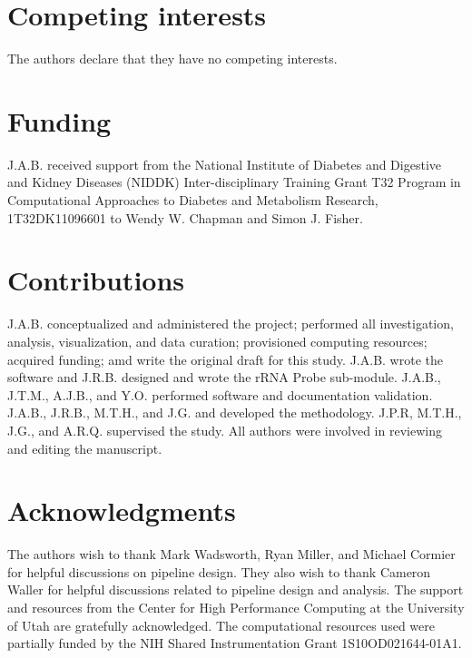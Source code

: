 \documentclass[11pt, a4paper, oneside]{article}
\begin{document}
\section*{Competing interests}
The authors declare that they have no competing interests.

\section*{Funding}
J.A.B. received support from the National Institute of Diabetes and Digestive and Kidney Diseases (NIDDK) Inter-disciplinary Training Grant T32 Program in Computational Approaches to Diabetes and Metabolism Research, 1T32DK11096601 to Wendy W. Chapman and Simon J. Fisher.

\section*{Contributions}
J.A.B. conceptualized and administered the project; performed all investigation, analysis, visualization, and data curation; provisioned computing resources; acquired funding; amd write the original draft for this study. J.A.B. wrote the software and J.R.B. designed and wrote the rRNA Probe sub-module. J.A.B., J.T.M., A.J.B., and Y.O. performed software and documentation validation. J.A.B., J.R.B., M.T.H., and J.G. and developed the methodology. J.P.R, M.T.H., J.G., and A.R.Q. supervised the study. All authors were involved in reviewing and editing the manuscript.

\section*{Acknowledgments}
The authors wish to thank Mark Wadsworth, Ryan Miller, and Michael Cormier for helpful discussions on pipeline design. They also wish to thank Cameron Waller for helpful discussions related to pipeline design and analysis. The support and resources from the Center for High Performance Computing at the University of Utah are gratefully acknowledged. The computational resources used were partially funded by the NIH Shared Instrumentation Grant 1S10OD021644-01A1.




\end{document}
